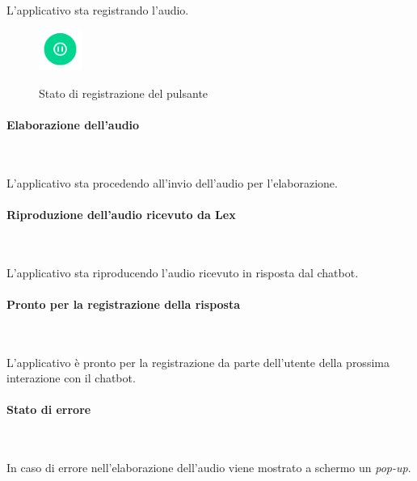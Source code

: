 	\noindent L'applicativo sta registrando l'audio. 
	
	\begin{figure}[H]
		\centering
		\includegraphics[width=1.4cm]{immagini/registrazione.png} \\
		\caption{\label{fig:registrazione} Stato di registrazione del pulsante}
	\end{figure}
	
	
	\paragraph{Elaborazione dell'audio}  ~\smallskip 
	
	\noindent L'applicativo sta procedendo all'invio dell'audio per l'elaborazione. 
	
	
	\paragraph{Riproduzione dell'audio ricevuto da Lex}  ~\smallskip 
	
	\noindent L'applicativo sta riproducendo l'audio ricevuto in risposta dal \gls{chatbot}.
	 

	\paragraph{Pronto per la registrazione della risposta}  ~\smallskip 
	
	\noindent L'applicativo è pronto per la registrazione da parte dell'utente della prossima interazione con il \gls{chatbot}. 
	
	\paragraph{Stato di errore} ~\smallskip 
	
	\noindent In caso di errore nell'elaborazione dell'audio viene mostrato a schermo un \emph{pop-up}.
